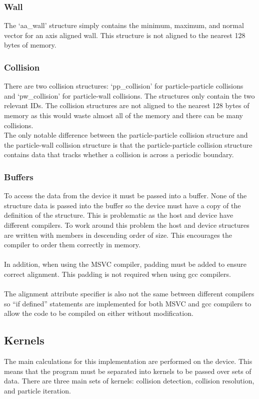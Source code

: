 \documentclass[a4paper,11pt,titlepage]{report}
\begin{document}
\subsubsection{Wall}
The `aa\_wall' structure simply contains the minimum, maximum, and normal vector for an axis aligned wall. This structure is not aligned to the nearest 128 bytes of memory.
\subsubsection{Collision}
There are two collision structures: `pp\_collision' for particle-particle collisions and `pw\_collision' for particle-wall collisions. The structures only contain the two relevant IDs. The collision structures are not aligned to the nearest 128 bytes of memory as this would waste almost all of the memory and there can be many collisions.
\\The only notable difference between the particle-particle collision structure and the particle-wall collision structure is that the particle-particle collision structure contains data that tracks whether a collision is across a periodic boundary.
\subsubsection{Buffers}
To access the data from the device it must be passed into a buffer. None of the structure data is passed into the buffer so the device must have a copy of the definition of the structure. This is problematic as the host and device have different compilers. To work around this problem the host and device structures are written with members in descending order of size. This encourages the compiler to order them correctly in memory.
\\\\In addition, when using the MSVC compiler, padding must be added to ensure correct alignment. This padding is not required when using gcc compilers. 
\\\\The alignment attribute specifier is also not the same between different compilers so ``if defined'' statements are implemented for both MSVC and gcc compilers to allow the code to be compiled on either without modification.
\subsection{Kernels}
The main calculations for this implementation are performed on the device. This means that the program must be separated into kernels to be passed over sets of data. There are three main sets of kernels: collision detection, collision resolution, and particle iteration.
\end{document}
